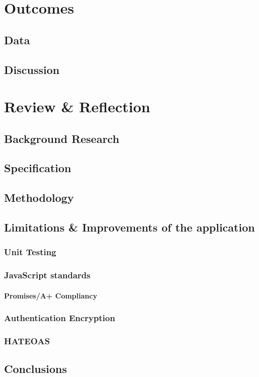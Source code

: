 \documentclass[]{report}
\begin{document}
	\chapter{Outcomes}
		\section{Data}
	

		\section{Discussion}
		
	\chapter{Review \& Reflection}	
		\section{Background Research}
		\section{Specification}
		\section{Methodology}
		\section{Limitations \& Improvements of the application}
			\subsection{Unit Testing}
			\subsection{JavaScript standards}
				\subsubsection{Promises/A+ Compliancy}
			\subsection{Authentication Encryption}
			\subsection{HATEOAS}
		\section{Conclusions}
\end{document}
